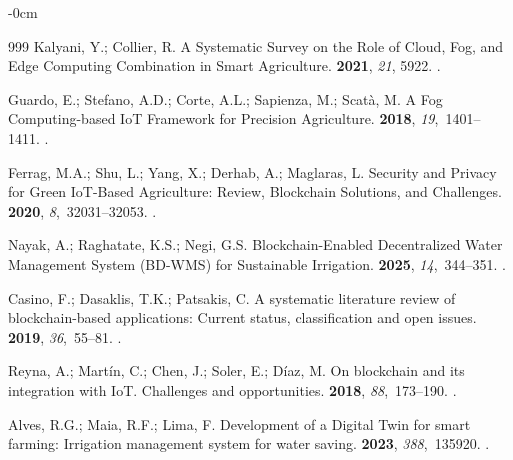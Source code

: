 \documentclass[land,review,accept,pdftex,oneauthor]{Definitions/mdpi}
\begin{document}
\begin{adjustwidth}{-\extralength}{0cm}
\begin{thebibliography}{999}
Kalyani, Y.; Collier, R.
\newblock A Systematic Survey on the Role of Cloud, Fog, and Edge Computing
  Combination in Smart Agriculture.
 {\bf 2021}, {\em 21}, 5922.
.

Guardo, E.; Stefano, A.D.; Corte, A.L.; Sapienza, M.; Scatà, M.
\newblock A Fog Computing-based IoT Framework for Precision Agriculture.
 {\bf 2018}, {\em
  19},~1401--1411.
.

Ferrag, M.A.; Shu, L.; Yang, X.; Derhab, A.; Maglaras, L.
\newblock Security and Privacy for Green IoT-Based Agriculture: Review,
  Blockchain Solutions, and Challenges.
 {\bf 2020}, {\em 8},~32031--32053.
.

Nayak, A.; Raghatate, K.S.; Negi, G.S.
\newblock Blockchain-Enabled Decentralized Water Management System ({BD-WMS})
  for Sustainable Irrigation.
 {\bf 2025},
  {\em 14},~344--351.
.

Casino, F.; Dasaklis, T.K.; Patsakis, C.
\newblock A systematic literature review of blockchain-based applications:
  Current status, classification and open issues.
 {\bf 2019}, {\em 36},~55--81.
.

Reyna, A.; Mart{\'i}n, C.; Chen, J.; Soler, E.; D{\'i}az, M.
\newblock On blockchain and its integration with IoT. Challenges and
  opportunities.
 {\bf 2018}, {\em
  88},~173--190.
.

Alves, R.G.; Maia, R.F.; Lima, F.
\newblock Development of a Digital Twin for smart farming: Irrigation
  management system for water saving.
 {\bf 2023}, {\em 388},~135920.
.


\end{thebibliography}
\end{adjustwidth}
\end{document}
